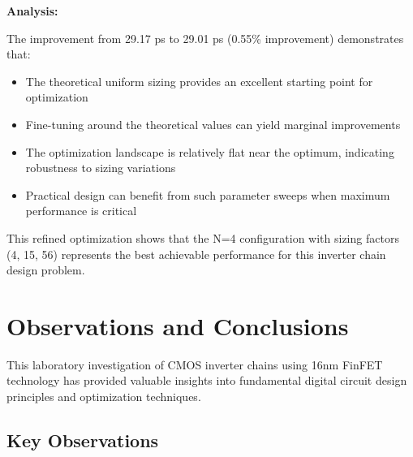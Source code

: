 \documentclass[UTF8,12pt,a4paper]{ctexart}
\begin{document}
\textbf{Analysis:}

The improvement from 29.17 ps to 29.01 ps (0.55\% improvement) demonstrates that:
\begin{itemize}
    \item The theoretical uniform sizing provides an excellent starting point for optimization
    \item Fine-tuning around the theoretical values can yield marginal improvements
    \item The optimization landscape is relatively flat near the optimum, indicating robustness to sizing variations
    \item Practical design can benefit from such parameter sweeps when maximum performance is critical
\end{itemize}

This refined optimization shows that the N=4 configuration with sizing factors (4, 15, 56) represents the best achievable performance for this inverter chain design problem.

\newpage
\section{Observations and Conclusions}

This laboratory investigation of CMOS inverter chains using 16nm FinFET technology has provided valuable insights into fundamental digital circuit design principles and optimization techniques.

\subsection{Key Observations}
\end{document}
